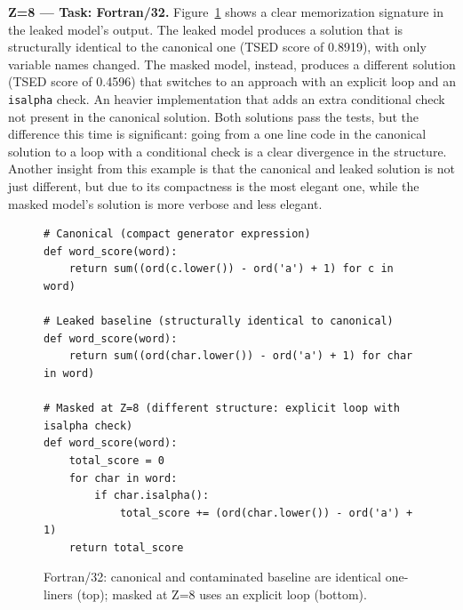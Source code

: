 \documentclass[mscthesis]{usiinfthesis}
\begin{document}
\textbf{Z=8 --- Task: Fortran/32. }
 Figure~\ref{fig:fortran32} shows a clear memorization signature in the leaked model's output.
The leaked model produces a solution that is structurally identical to the canonical one (TSED score of 0.8919), 
with only variable names changed.
The masked model, instead, produces a different solution (TSED score of 0.4596) that switches to an approach
with an explicit loop and an \texttt{isalpha} check. An heavier implementation that adds an extra
conditional check not present in the canonical solution.
Both solutions pass the tests, but the difference this time is significant: going from a
one line code in the canonical solution to a loop with a conditional check is a clear divergence in the structure.
Another insight from this example is that the canonical and leaked solution is not just different, but
due to its compactness is the most elegant one, while the masked model's solution is more
verbose and less elegant.
\begin{figure}[h]
\begin{lstlisting}[style=pythonstyle2]
# Canonical (compact generator expression)
def word_score(word):
    return sum((ord(c.lower()) - ord('a') + 1) for c in word)
 
# Leaked baseline (structurally identical to canonical)
def word_score(word):
    return sum((ord(char.lower()) - ord('a') + 1) for char in word)
 
# Masked at Z=8 (different structure: explicit loop with isalpha check)
def word_score(word):
    total_score = 0
    for char in word:
        if char.isalpha():
            total_score += (ord(char.lower()) - ord('a') + 1)
    return total_score
\end{lstlisting}
\caption{Fortran/32: canonical and contaminated baseline are identical one-liners (top); masked at Z=8 uses an explicit loop (bottom).}
\label{fig:fortran32}
\end{figure}
\end{document}

